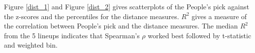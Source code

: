 Figure \ref{dist_1} and Figure \ref{dist_2} gives scatterplots of the People's pick against the z-scores and the percentiles for the distance measures. $R^2$ gives a measure of the correlation between People's pick and the distance measures. The median $R^2$ from the 5 lineups indicates that Spearman's $\rho$ worked best followed by t-statistic and weighted bin.


%

%

